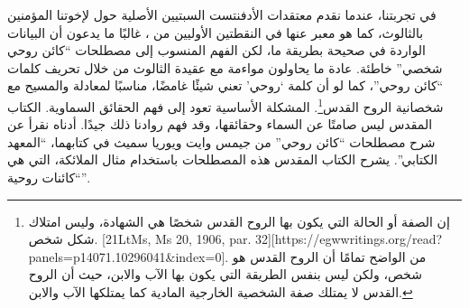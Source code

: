 في تجربتنا، عندما نقدم معتقدات الأدفنتست السبتيين الأصلية حول  لإخوتنا المؤمنين بالثالوث، كما هو معبر عنها في النقطتين الأوليين من ، غالبًا ما يدعون أن البيانات الواردة في  صحيحة بطريقة ما، لكن الفهم المنسوب إلى مصطلحات “كائن روحي شخصي” خاطئة. عادة ما يحاولون مواءمة  مع عقيدة الثالوث من خلال تحريف كلمات “كائن روحي”، كما لو أن كلمة ‘روحي’ تعني شيئًا غامضًا، مناسبًا لمعادلة  والمسيح مع شخصانية الروح القدس\footnote{إن الصفة أو الحالة التي يكون بها الروح القدس شخصًا هي الشهادة، وليس امتلاك شكل شخص. [21LtMs, Ms 20, 1906, par. 32][https://egwwritings.org/read?panels=p14071.10296041&index=0]. من الواضح تمامًا أن الروح القدس هو شخص، ولكن ليس بنفس الطريقة التي يكون بها الآب والابن، حيث أن الروح القدس لا يمتلك صفة الشخصية الخارجية المادية كما يمتلكها الآب والابن.}. المشكلة الأساسية تعود إلى فهم الحقائق السماوية. الكتاب المقدس ليس صامتًا عن السماء وحقائقها، وقد فهم روادنا ذلك جيدًا. أدناه نقرأ عن شرح مصطلحات “كائن روحي” من جيمس وايت ويوريا سميث في كتابهما، “المعهد الكتابي”. يشرح الكتاب المقدس هذه المصطلحات باستخدام مثال الملائكة، التي هي “كائنات روحية”.


